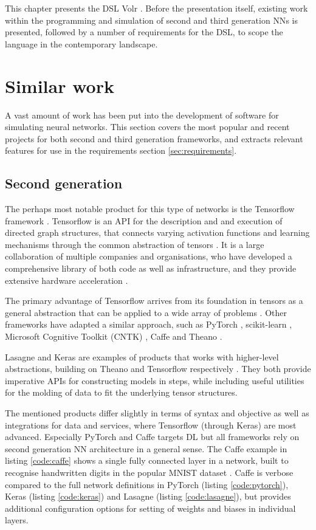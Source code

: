 \documentclass[report.tex]{subfiles}
\begin{document}
This chapter presents the \gls{DSL} Volr .
Before the presentation itself, existing work
within the programming and simulation of second and third generation
\gls{NN}s is presented, followed by a number of requirements for the
\gls{DSL}, to scope the language in the contemporary landscape.

\section{Similar work}
A vast amount of work has been put into the development of software for simulating
neural networks.
This section covers the most popular and recent projects for both second and third
generation frameworks, and extracts relevant
features for use in the requirements section \ref{sec:requirements}.

\subsection{Second generation}
The perhaps most notable product for this type of networks is the Tensorflow 
framework \cite{Abadi2016}.
Tensorflow is an \gls{API} for the description and and execution of directed graph 
structures,
that connects varying activation functions and learning mechanisms through the common abstraction
of tensors \cite{Abadi2015}.
It is a large collaboration of multiple companies and organisations, who have
developed a comprehensive library of both code as well as infrastructure, and they
provide extensive hardware acceleration \cite{Abadi2015}.

The primary advantage of Tensorflow  arrives from 
its foundation in tensors as a general abstraction that
can be applied to a wide array of problems \cite{Abadi2016}.
Other frameworks have adapted a similar approach, such as PyTorch \cite{PyTorch2018}, 
scikit-learn \cite{Sklearn2018}, Microsoft Cognitive Toolkit (CNTK) \cite{CNTK2018},
Caffe \cite{Caffe2018} and Theano \cite{Theano2018}.

Lasagne and Keras are examples of products that works with higher-level abstractions,
building on Theano and Tensorflow respectively \cite{Lasagne2018, Keras2018}.
They both provide imperative \gls{API}s for constructing models in steps, while
including useful utilities for the molding of data to fit the underlying tensor structures.

The mentioned products differ slightly in terms of syntax and objective 
as well as integrations for data and services, where Tensorflow (through Keras)
are most advanced.
Especially PyTorch and Caffe targets \gls{DL} but all frameworks
rely on second generation \gls{NN} architecture in a general sense.
The Caffe example in listing \ref{code:caffe} shows a single fully connected
layer in a network, built to recognise handwritten digits in the 
popular MNIST dataset \cite{LeCun1998}.
Caffe is verbose compared to the full network definitions in PyTorch 
(listing \ref{code:pytorch}), Keras (listing \ref{code:keras}) and
Lasagne (listing \ref{code:lasagne}), but provides additional 
configuration options for setting of weights and biases in 
individual layers.
\end{document}

